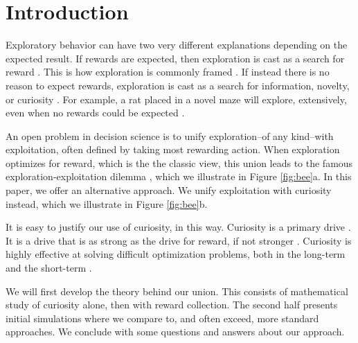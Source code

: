 \section*{Introduction}
Exploratory behavior can have two very different explanations depending on the expected result. If rewards are expected, then exploration is cast as a search for reward \cite{Gupta2006,Sutton2018,Woodgate2017,Lee2011a,Schulz2018a,Calhoun2014}. This is how exploration is commonly framed \cite{Sutton2018}. If instead there is no reason to expect rewards, exploration is cast as a search for information, novelty, or curiosity \cite{Berlyne1950,Schmidhuber1991,Kidd2015,Jaegle2019,Sumner2019,Wang2019,Auersperg2015}. For example, a rat placed in a novel maze will explore, extensively, even when no rewards could be expected \cite{Rosenberg2021}.

An open problem in decision science is to unify exploration--of any kind--with exploitation, often defined by taking most rewarding action. When exploration optimizes for reward, which is the the classic view, this union leads to the famous exploration-exploitation dilemma \cite{Kelly1956,Berger-Tal2014,Dayan1996,Thrun1992,Mehlhorn2015,Kobayashi2019}, which we illustrate in Figure \ref{fig:bee}a. In this paper, we offer an alternative approach. We unify exploitation with curiosity instead, which we illustrate in Figure \ref{fig:bee}b.  

It is easy to justify our use of curiosity, in this way. Curiosity is a primary drive \cite{Berlyne1950,Loewenstein1994,Inglis2001}. It is a drive that is as strong as the drive for reward, if not stronger \cite{Loewenstein1994,Kidd2015,Gottlieb2018,Sumner2019,Gopnik2020,Song2019,Wang2019}. Curiosity is highly effective at solving difficult optimization problems, both in the long-term and the short-term \cite{Schmidhuber1991,Pathak2017,Stanton2018,Fister2019,Mouret2015,Colas2020,Cully2015,Pathak2017,Schwartenbeck2019,Laversanne-Finot2018}. 

We will first develop the theory behind our union. This consists of mathematical study of curiosity alone, then with reward collection. The second half presents initial simulations where we compare to, and often exceed, more standard approaches. We conclude with some questions and answers about our approach.

